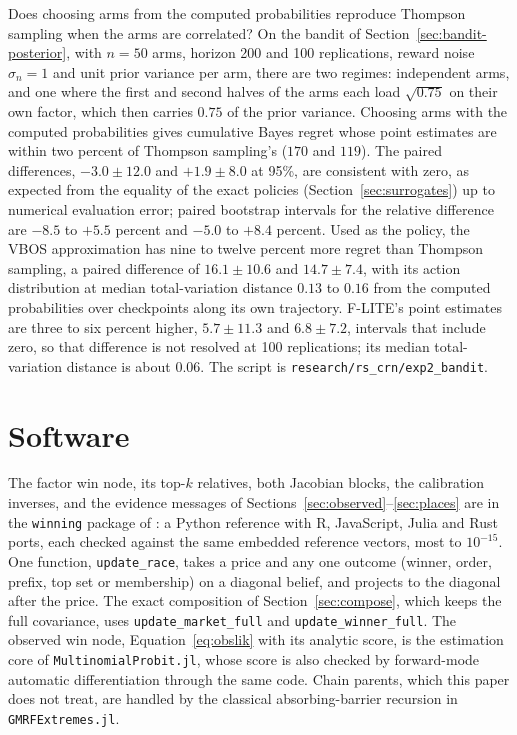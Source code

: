 \documentclass[11pt]{article}
\begin{document}
Does choosing arms from the computed probabilities reproduce Thompson
sampling when the arms are correlated? On the bandit of
Section~\ref{sec:bandit-posterior}, with $n=50$ arms, horizon 200 and
100 replications, reward noise $\sigma_n=1$ and unit prior variance
per arm, there are two regimes: independent arms, and one where the
first and second halves of the arms each load $\sqrt{0.75}$ on their
own factor, which then carries $0.75$ of the prior variance. Choosing
arms with the computed probabilities gives cumulative Bayes regret
whose point estimates are within two percent of Thompson sampling's
($170$ and $119$). The paired differences, $-3.0\pm12.0$ and
$+1.9\pm8.0$ at 95\%, are consistent with zero, as expected from the
equality of the exact policies (Section~\ref{sec:surrogates}) up to
numerical evaluation error; paired bootstrap intervals for the
relative difference are $-8.5$ to $+5.5$ percent and $-5.0$ to $+8.4$
percent. Used as the policy, the VBOS approximation has nine to
twelve percent more regret than Thompson sampling, a paired difference of
$16.1\pm10.6$ and $14.7\pm7.4$, with its action distribution at
median total-variation distance $0.13$ to $0.16$ from the computed
probabilities over checkpoints along its own trajectory. F-LITE's point estimates are
three to six percent higher, $5.7\pm11.3$ and $6.8\pm7.2$, intervals
that include zero, so that difference is not resolved at 100
replications; its median total-variation distance is about $0.06$. The script is
\texttt{research/rs\_crn/exp2\_bandit}.

\section{Software}
\label{sec:software}

The factor win node, its top-$k$ relatives, both Jacobian blocks,
the calibration inverses, and the evidence messages of
Sections~\ref{sec:observed}--\ref{sec:places} are in the \texttt{winning} package of
\citet{cotton2026}: a Python reference with R, JavaScript, Julia and
Rust ports, each checked against the same embedded reference
vectors, most to $10^{-15}$. One function, \texttt{update\_race}, takes a
price and any one outcome (winner, order, prefix, top set or
membership) on a diagonal belief, and projects to the diagonal after
the price. The exact composition of Section~\ref{sec:compose}, which
keeps the full covariance, uses \texttt{update\_market\_full} and
\texttt{update\_winner\_full}. The
observed win node, Equation~\eqref{eq:obslik} with its analytic
score, is the estimation core of \texttt{MultinomialProbit.jl}, whose
score is also checked by forward-mode automatic differentiation
through the same code. Chain parents, which this paper does not
treat, are handled by the classical absorbing-barrier recursion in
\texttt{GMRFExtremes.jl}.
\end{document}

